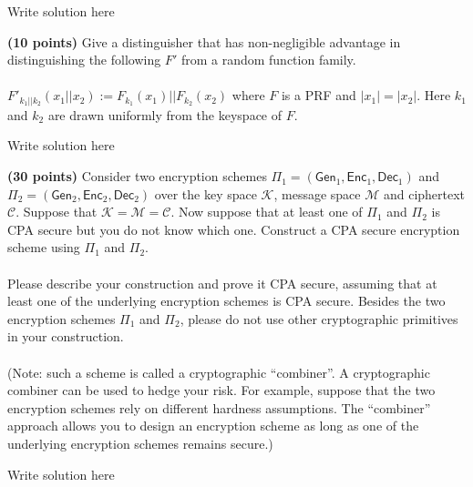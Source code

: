 \documentclass[12pt]{hw}
\begin{document}
\begin{answer}
Write solution here
\end{answer}

\begin{exercise}
  \textbf{(10 points)} Give a distinguisher that has non-negligible advantage in distinguishing the following $F'$ from a random function family.\\\\
      $F'_{k_1 || k_2}(x_1 || x_2) := F_{k_1}(x_1) || F_{k_2}(x_2)$ where $F$ is a PRF and $|x_1| = |x_2|$. Here $k_1$ and $k_2$ are drawn uniformly from the keyspace of $F$.
\end{exercise}

\begin{answer}
Write solution here
\end{answer}



\begin{exercise}
  \textbf{(30 points)} Consider two encryption schemes 
$\Pi_1 = (\mathsf{Gen}_1, \mathsf{Enc}_1, \mathsf{Dec}_1)$ and 
$\Pi_2 = (\mathsf{Gen}_2, \mathsf{Enc}_2, \mathsf{Dec}_2)$ 
over the key space $\mathcal{K}$, message space $\mathcal{M}$ and ciphertext $\mathcal{C}$. 
Suppose that $\mathcal{K} = \mathcal{M} = \mathcal{C}$.
Now suppose that at least one of $\Pi_1$ and $\Pi_2$ is 
CPA secure but you do not know which one. 
Construct a CPA secure encryption scheme using $\Pi_1$ and $\Pi_2$.
\\\\
Please describe your construction and prove it CPA secure, assuming that at least
one of the underlying encryption schemes is CPA secure.
Besides the two encryption schemes $\Pi_1$ and 
$\Pi_2$, 
please do not use other cryptographic 
primitives in your construction.
\\\\
(Note: such a scheme is called a cryptographic ``combiner''.
A cryptographic
combiner can be used to hedge your risk. For example,
suppose that the two encryption schemes rely on different hardness assumptions.
The ``combiner'' approach
allows you to design 
an encryption scheme as long as 
one of the underlying encryption schemes remains secure.)
\end{exercise}

\begin{answer}
Write solution here
\end{answer}



\end{document}
